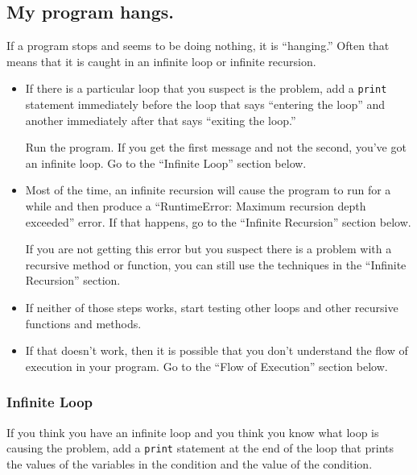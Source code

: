 \documentclass[10pt]{book}
\begin{document}
{\subsection{My program hangs.}

If a program stops and seems to be doing nothing, it is ``hanging.''
Often that means that it is caught in an infinite loop or infinite
recursion.

\begin{itemize}

\item If there is a particular loop that you suspect is the
problem, add a {\tt print} statement immediately before the loop that says
``entering the loop'' and another immediately after that says
``exiting the loop.''

Run the program.  If you get the first message and not the second,
you've got an infinite loop.  Go to the ``Infinite Loop'' section
below.

\item Most of the time, an infinite recursion will cause the program
to run for a while and then produce a ``RuntimeError: Maximum
recursion depth exceeded'' error.  If that happens, go to the
``Infinite Recursion'' section below.

If you are not getting this error but you suspect there is a problem
with a recursive method or function, you can still use the techniques
in the ``Infinite Recursion'' section.

\item If neither of those steps works, start testing other
loops and other recursive functions and methods.

\item If that doesn't work, then it is possible that
you don't understand the flow of execution in your program.
Go to the ``Flow of Execution'' section below.

\end{itemize}


\subsubsection{Infinite Loop}

If you think you have an infinite loop and you think you know
what loop is causing the problem, add a {\tt print} statement at
the end of the loop that prints the values of the variables in
the condition and the value of the condition.

}
\end{document}
